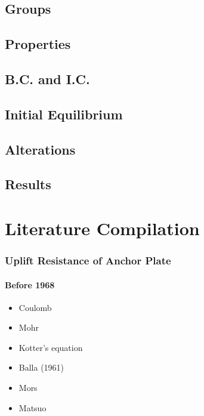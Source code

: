 \documentclass[a4paper, nobind]{templates/ociamthesis}
\providecommand{\tightlist}{%
  \setlength{\itemsep}{0pt}\setlength{\parskip}{0pt}}
\begin{document}
\hypertarget{groups-3}{%
\section{Groups}\label{groups-3}}

\hypertarget{properties-4}{%
\section{Properties}\label{properties-4}}

\hypertarget{b.c.-and-i.c.-3}{%
\section{B.C. and I.C.}\label{b.c.-and-i.c.-3}}

\hypertarget{initial-equilibrium-3}{%
\section{Initial Equilibrium}\label{initial-equilibrium-3}}

\hypertarget{alterations-3}{%
\section{Alterations}\label{alterations-3}}

\hypertarget{results-3}{%
\section{Results}\label{results-3}}

\hypertarget{literature-compilation}{%
\chapter{Literature Compilation}\label{literature-compilation}}

\hypertarget{uplift-resistance-of-anchor-plate}{%
\subsection{Uplift Resistance of Anchor Plate}\label{uplift-resistance-of-anchor-plate}}

\hypertarget{before-1968}{%
\subsubsection{Before 1968}\label{before-1968}}

\begin{itemize}
\tightlist
\item
  Coulomb
\item
  Mohr
\item
  Kotter's equation
\item
  Balla (1961)
\item
  Mors
\item
  Matsuo
\end{itemize}
\end{document}
